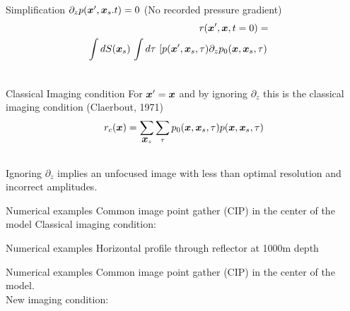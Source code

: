 \documentclass[xcolor=dvipsnames,notes]{beamer}
\begin{document}
\begin{frame}{Simplification}
$\partial_z p(\mbox{\boldmath $x$}',\mbox{\boldmath $x$}_s.t)=0$ (No recorded pressure gradient)
\begin{eqnarray}
 r(\mbox{\boldmath $x$}',\mbox{\boldmath $x$},t=0)=\nonumber\\
\int dS(\mbox{\boldmath $x$}_s)\, \int d\tau\, \left[p(\mbox{\boldmath $x$}',\mbox{\boldmath $x$}_s,\tau)\partial_z p_0(\mbox{\boldmath $x$},\mbox{\boldmath $x$}_s,\tau)\right.\nonumber\\
&&                   \label{eq:10600}
\end{eqnarray}
\end{frame}
\begin{frame}{Classical Imaging condition}
For $\mbox{\boldmath $x$}'=\mbox{\boldmath $x$}$ and by ignoring $\partial_z$ this is the classical imaging condition (Claerbout, 1971)
\begin{eqnarray}
  r_{c}(\mbox{\boldmath $x$}) =
    \sum_{\mbox{\boldmath $x$}_s}\sum_{\tau}p_0(\mbox{\boldmath $x$},\mbox{\boldmath $x$}_s,\tau)p(\mbox{\boldmath $x$},\mbox{\boldmath $x$}_s,\tau)\nonumber\\ 
                                                 \nonumber
\end{eqnarray}
Ignoring $\partial_z$ implies an unfocused image with 
less than optimal resolution and incorrect amplitudes.
\end{frame}
\begin{frame}{Numerical examples}
Common image point gather (CIP) in the center of the model
Classical imaging condition: 
\begin{figure}
\end{figure}
\end{frame}
\begin{frame}{Numerical examples}
Horizontal profile through reflector at 1000m depth
\begin{figure}
\end{figure}
\end{frame}
\begin{frame}{Numerical examples}
Common image point gather (CIP) in the center of the model.\\
New imaging condition: 
\begin{figure}
\end{figure}
\end{frame}
\end{document}
